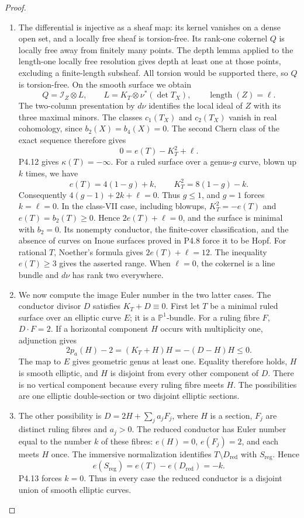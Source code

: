 \begin{proof}

\begin{enumerate}[label={$\langle1\rangle$\arabic*.},leftmargin=*]
\item The differential is injective as a sheaf map: its kernel vanishes
on a dense open set, and a locally free sheaf is torsion-free.
Its rank-one cokernel $Q$ is locally free away from finitely many
points. The depth lemma applied to the length-one locally free
resolution gives depth at least one at those points, excluding
a finite-length subsheaf. All torsion would be supported there,
so $Q$ is torsion-free. On the smooth surface we obtain
\[
 Q=\mathcal I_Z\otimes L,\qquad
 L=K_T\otimes\nu^*(\det T_X),\qquad \operatorname{length}(Z)=\ell.
\]
The two-column presentation by $d\nu$ identifies the local ideal
of $Z$ with its three maximal minors. The classes $c_1(T_X)$ and
$c_2(T_X)$ vanish in real cohomology, since $b_2(X)=b_4(X)=0$.
The second Chern class of the exact sequence therefore gives
\[
 0=e(T)-K_T^2+\ell.
\]
P4.12 gives $\kappa(T)=-\infty$. For a ruled surface over a
genus-$g$ curve, blown up $k$ times, we have
\[
 e(T)=4(1-g)+k,\qquad K_T^2=8(1-g)-k.
\]
Consequently $4(g-1)+2k+\ell=0$. Thus $g\leq1$, and $g=1$
forces $k=\ell=0$. In the class-VII case, including blowups,
$K_T^2=-e(T)$ and $e(T)=b_2(T)\geq0$. Hence
$2e(T)+\ell=0$, and the surface is minimal with $b_2=0$.
Its nonempty conductor, the finite-cover classification, and the
absence of curves on Inoue surfaces proved in P4.8 force it to
be Hopf. For rational $T$, Noether's formula gives
$2e(T)+\ell=12$. The inequality $e(T)\geq3$ gives the asserted
range. When $\ell=0$, the cokernel is a line bundle and $d\nu$
has rank two everywhere.

\item We now compute the image Euler number in the two latter cases.
The conductor divisor $D$ satisfies $K_T+D\equiv0$. First let
$T$ be a minimal ruled surface over an elliptic curve $E$;
it is a $\mathbb P^1$-bundle. For a ruling fibre $F$, $D\cdot F=2$.
If a horizontal component $H$ occurs with multiplicity one,
adjunction gives
\[
 2p_a(H)-2=(K_T+H)H=-(D-H)H\leq0.
\]
The map to $E$ gives geometric genus at least one. Equality
therefore holds, $H$ is smooth elliptic, and $H$ is disjoint
from every other component of $D$. There is no vertical
component because every ruling fibre meets $H$. The possibilities
are one elliptic double-section or two disjoint elliptic sections.

\item The other possibility is $D=2H+\sum_j a_jF_j$, where $H$ is a
section, $F_j$ are distinct ruling fibres and $a_j>0$.
The reduced conductor has Euler number equal to the number $k$
of these fibres: $e(H)=0$, $e(F_j)=2$, and each meets $H$ once.
The immersive normalization identifies $T\setminus D_{\mathrm{red}}$
with $S_{\mathrm{reg}}$. Hence
\[
 e(S_{\mathrm{reg}})=e(T)-e(D_{\mathrm{red}})=-k.
\]
P4.13 forces $k=0$. Thus in every case the reduced conductor is
a disjoint union of smooth elliptic curves.


\end{enumerate}
\end{proof}
